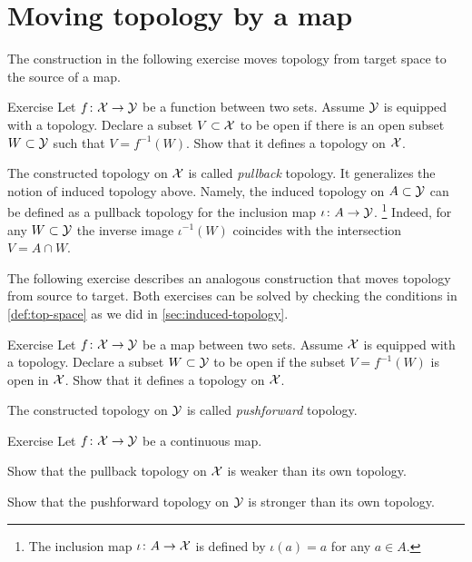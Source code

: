 \section{Moving topology by a map}

The construction in the following exercise moves topology from target space to the source of a map.

\begin{thm}{Exercise}\label{ex:move-topology:pullback}
Let $f\colon\mathcal{X}\to\mathcal{Y}$ be a function between two sets.
Assume $\mathcal{Y}$ is equipped with a topology.
Declare a subset $V\subset\mathcal{X}$  to be open if there is an open subset $W\subset\mathcal{Y}$ 
such that $V=f^{-1}(W)$.
Show that it defines a topology on $\mathcal{X}$.
\end{thm}

The constructed topology on $\mathcal{X}$ is called \emph{pullback} topology.
It generalizes the notion of induced topology above.
Namely, the induced topology on $A\subset \mathcal{Y}$ can be defined as a pullback topology for the inclusion map $\iota\colon A\to \mathcal{Y}$.%
\footnote{The inclusion map $\iota\colon A\to \mathcal{X}$ is defined by $\iota(a)=a$ for any $a\in A$.}
Indeed, for any $W\subset \mathcal{Y}$ the inverse image $\iota^{-1}(W)$ coincides with the intersection  $V=A\cap W$.

The following exercise describes an analogous construction that moves topology from source to target.
Both exercises can be solved by checking the conditions in \ref{def:top-space} as we did in \ref{sec:induced-topology}.

\begin{thm}{Exercise}\label{ex:move-topology:pushforward}
Let $f\colon\mathcal{X}\to\mathcal{Y}$ be a map between two sets.
Assume $\mathcal{X}$ is equipped with a topology.
Declare a subset $W\subset\mathcal{Y}$ to be open if the subset $V=f^{-1}(W)$ is open in $\mathcal{X}$.
Show that it defines a topology on $\mathcal{X}$.

\end{thm}

The constructed topology on $\mathcal{Y}$ is called \emph{pushforward} topology.

\begin{thm}{Exercise}
Let $f\colon\mathcal{X}\to\mathcal{Y}$ be a continuous map.

\begin{subthm}{}
Show that the pullback topology on $\mathcal{X}$ is weaker than its own topology.
\end{subthm}

\begin{subthm}{}
Show that the pushforward topology on $\mathcal{Y}$ is stronger than its own topology.
\end{subthm}

\end{thm}

